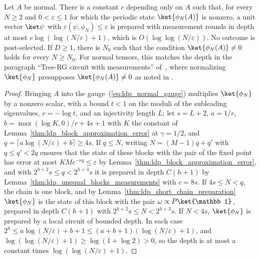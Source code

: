 \begin{lemma}
    \label{thm:ldp_loglog_depth_every_length}
    \leanok
    Let $A$ be normal. There is a constant $c$ depending only on $A$ such that,
    for every $N\ge2$ and $0<\varepsilon\le1$ for which the periodic state
    $\ket{\phi_N(A)}$ is nonzero, a unit vector $\ket\psi$ with
    $\varepsilon(\psi,\phi_N)\le\varepsilon$ is prepared with measurement rounds
    in depth at most $c\log(\log(N/\varepsilon)+1)$, which is
    $O(\log\log(N/\varepsilon))$. No outcome is post-selected. If $D\ge1$, there
    is $N_0$ such that the condition $\ket{\phi_N(A)}\neq0$ holds for every
    $N\ge N_0$. For normal tensors, this matches the depth in the paragraph
    ``Tree-RG circuit with measurements'' of~\cite{Malz2024Preparation}, where
    normalizing $\ket{\phi_N}$ presupposes $\ket{\phi_N(A)}\neq0$ as noted in
    \cite{gap:mswc24_depth_upper_bound_nonzero_state}.
\end{lemma}
\begin{proof}
    \leanok
    Bringing $A$ into the gauge~(\ref{eq:ldp_normal_gauge}) multiplies
    $\ket{\phi_N}$ by a nonzero scalar, with a bound $t<1$ on the moduli of the
    subleading eigenvalues, $r=-\log t$, and an injectivity length $L$;
    let $s=L+2$, $a=1/r$, $b=\max(\log K,0)/r+4s+1$ with $K$ the constant of
    Lemma~\ref{thm:ldp_block_approximation_error} at $\gamma=1/2$, and
    $q=\lceil a\log(N/\varepsilon)+b\rceil\ge4s$. If $q\le N$, writing
    $N=(M-1)q+q'$ with $q\le q'<2q$ ensures that the state of these blocks with the pair of
    the fixed point has error at most $KMe^{-rq}\le\varepsilon$ by
    Lemma~\ref{thm:ldp_block_approximation_error}, and with
    $2^{h+2}s\le q<2^{h+3}s$ it is prepared in depth $C(h+1)$ by
    Lemma~\ref{thm:ldp_unequal_blocks_measurements} with $c=8s$. If
    $4s\le N<q$, the chain is one block, and by
    Lemma~\ref{thm:ldp_short_chain_preparation} $\ket{\phi_N}$ is the state of
    this block with the pair $\omega\propto P\ket{\mathbb 1}$, prepared in depth
    $C(h+1)$ with $2^{h+2}s\le N<2^{h+3}s$. If $N<4s$, $\ket{\phi_N}$ is prepared
    by a local circuit of bounded depth. In each case $2^h\le
        a\log(N/\varepsilon)+b+1\le(a+b+1)(\log(N/\varepsilon)+1)$, and
    $\log(\log(N/\varepsilon)+1)\ge\log(1+\log2)>0$, so the depth is at most a
    constant times $\log(\log(N/\varepsilon)+1)$.
\end{proof}
